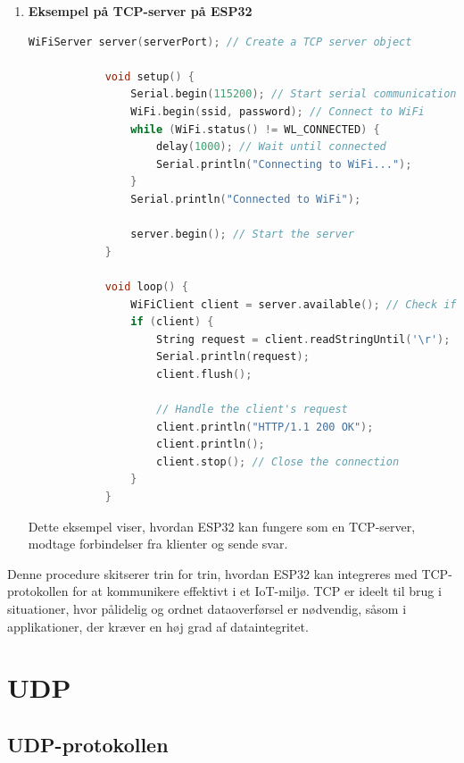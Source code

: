 \documentclass[12pt,a4paper]{book}
\begin{document}
\begin{enumerate}
\begin{lstlisting}[language=C++, caption=Syntaks]
				// Send data to the server
				client.println("Hello, Server!");
				
				// Receive data from the server
				while (client.available()) {
					String line = client.readStringUntil('\r');
					Serial.print(line);
				}
				
				delay(10000); // Wait 10 seconds before the next update
			}
		\end{lstlisting}
		Dette eksempel viser, hvordan ESP32 kan sende en besked til en TCP-server og modtage et svar.
		
		\item \textbf{Eksempel på TCP-server på ESP32}
		\begin{lstlisting}[language=C++, caption=Syntaks]
			WiFiServer server(serverPort); // Create a TCP server object
			
			void setup() {
				Serial.begin(115200); // Start serial communication
				WiFi.begin(ssid, password); // Connect to WiFi
				while (WiFi.status() != WL_CONNECTED) {
					delay(1000); // Wait until connected
					Serial.println("Connecting to WiFi...");
				}
				Serial.println("Connected to WiFi");
				
				server.begin(); // Start the server
			}
			
			void loop() {
				WiFiClient client = server.available(); // Check if a client has connected
				if (client) {
					String request = client.readStringUntil('\r');
					Serial.println(request);
					client.flush();
					
					// Handle the client's request
					client.println("HTTP/1.1 200 OK");
					client.println();
					client.stop(); // Close the connection
				}
			}
		\end{lstlisting}
		Dette eksempel viser, hvordan ESP32 kan fungere som en TCP-server, modtage forbindelser fra klienter og sende svar.
	\end{enumerate}
	\noindent Denne procedure skitserer trin for trin, hvordan ESP32 kan integreres med TCP-protokollen for at kommunikere effektivt i et IoT-miljø. TCP er ideelt til brug i situationer, hvor pålidelig og ordnet dataoverførsel er nødvendig, såsom i applikationer, der kræver en høj grad af dataintegritet.
	
	
	\chapter{UDP}
	\section{UDP-protokollen}
\end{document}
